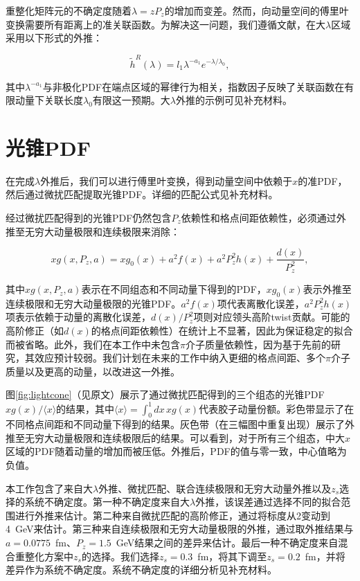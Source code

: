 \documentclass[12pt,a4paper]{ctexart}
\begin{document}
重整化矩阵元的不确定度随着$\lambda = zP_z$的增加而变差。然而，向动量空间的傅里叶变换需要所有距离上的准关联函数。为解决这一问题，我们遵循文献\cite{Ji2021}，在大$\lambda$区域采用以下形式的外推：

\begin{equation}
\tilde{h}^R(\lambda) = l_1 \lambda^{-a_1} e^{-\lambda/\lambda_0},
\label{eq:lambda_extrap}
\end{equation}

其中$\lambda^{-a_1}$与非极化PDF在端点区域的幂律行为相关，指数因子反映了关联函数在有限动量下关联长度$\lambda_0$有限这一预期\cite{Ji2021}。大$\lambda$外推的示例可见补充材料\cite{supplemental}。

\section{光锥PDF}

在完成$\lambda$外推后，我们可以进行傅里叶变换，得到动量空间中依赖于$x$的准PDF，然后通过微扰匹配提取光锥PDF。详细的匹配公式见补充材料\cite{supplemental}。

经过微扰匹配得到的光锥PDF仍然包含$P_z$依赖性和格点间距依赖性，必须通过外推至无穷大动量极限和连续极限来消除：

\begin{equation}
xg(x, P_z, a) = xg_0(x) + a^2 f(x) + a^2 P_z^2 h(x) + \frac{d(x)}{P_z^2},
\label{eq:extrap}
\end{equation}

其中$xg(x, P_z, a)$表示在不同组态和不同动量下得到的PDF，$xg_0(x)$表示外推至连续极限和无穷大动量极限的光锥PDF。$a^2 f(x)$项代表离散化误差，$a^2 P_z^2 h(x)$项表示依赖于动量的离散化误差，$d(x)/P_z^2$项则对应领头高阶twist贡献。可能的高阶修正（如$d(x)$的格点间距依赖性）在统计上不显著，因此为保证稳定的拟合而被省略。此外，我们在本工作中未包含$\pi$介子质量依赖性，因为基于先前的研究\cite{Fan2023}，其效应预计较弱。我们计划在未来的工作中纳入更细的格点间距、多个$\pi$介子质量以及更高的动量，以改进这一外推。

图\ref{fig:lightcone}（见原文）展示了通过微扰匹配得到的三个组态的光锥PDF $xg(x)/\langle x \rangle$的结果，其中$\langle x \rangle = \int_0^1 dx\, xg(x)$代表胶子动量份额。彩色带显示了在不同格点间距和不同动量下得到的结果。灰色带（在三幅图中重复出现）展示了外推至无穷大动量极限和连续极限后的结果。可以看到，对于所有三个组态，中大$x$区域的PDF随着动量的增加而被压低。外推后，PDF的值与零一致，中心值略为负值。

本工作包含了来自大$\lambda$外推、微扰匹配、联合连续极限和无穷大动量外推以及$z_s$选择的系统不确定度。第一种不确定度来自大$\lambda$外推，该误差通过选择不同的拟合范围进行外推来估计。第二种来自微扰匹配的高阶修正，通过将标度从2变动到4~GeV来估计。第三种来自连续极限和无穷大动量极限的外推，通过取外推结果与$a = 0.0775$~fm、$P_z = 1.5$~GeV结果之间的差异来估计。最后一种不确定度来自混合重整化方案中$z_s$的选择。我们选择$z_s = 0.3$~fm，将其下调至$z_s = 0.2$~fm，并将差异作为系统不确定度。系统不确定度的详细分析见补充材料\cite{supplemental}。
\end{document}
